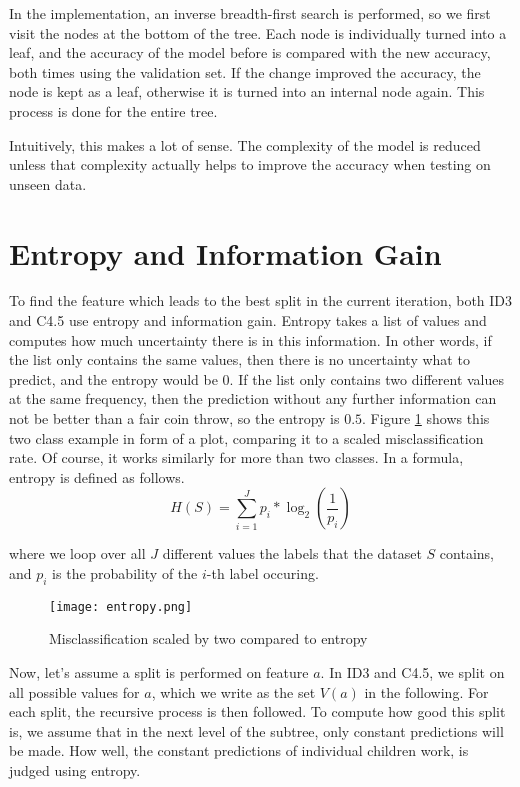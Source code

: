\documentclass[a4paper]{article}
\begin{document}
In the implementation, an inverse breadth-first search is performed, so we first visit the nodes at the bottom of the tree. Each node is individually turned into a leaf, and the accuracy of the model before is compared with the new accuracy, both times using the validation set. If the change improved the accuracy, the node is kept as a leaf, otherwise it is turned into an internal node again. This process is done for the entire tree.

Intuitively, this makes a lot of sense. The complexity of the model is reduced unless that complexity actually helps to improve the accuracy when testing on unseen data.

\section{Entropy and Information Gain}
\label{sec:entropy}

To find the feature which leads to the best split in the current iteration, both ID3 and C4.5 use entropy and information gain. Entropy takes a list of values and computes how much uncertainty there is in this information. In other words, if the list only contains the same values, then there is no uncertainty what to predict, and the entropy would be $0$. If the list only contains two different values at the same frequency, then the prediction without any further information can not be better than a fair coin throw, so the entropy is $0.5$.  Figure \ref{fig:entropy} shows this two class example in form of a plot, comparing it to a scaled misclassification rate. Of course, it works similarly for more than two classes. In a formula, entropy is defined as follows.
\[
	H(S) = \sum\limits_{i = 1}^J p_i * \log_2\left(\frac{1}{p_i}\right)
\]

\noindent where we loop over all $J$ different values the labels that the dataset $S$ contains, and $p_i$ is the probability of the $i$-th label occuring.

\begin{figure}[h]
	\texttt{[image: entropy.png]}
    \caption{Misclassification scaled by two compared to entropy}
    \label{fig:entropy}
\end{figure}

Now, let's assume a split is performed on feature $a$. In ID3 and C4.5, we split on all possible values for $a$, which we write as the set $V(a)$ in the following. For each split, the recursive process is then followed. To compute how good this split is, we assume that in the next level of the subtree, only constant predictions will be made. How well, the constant predictions of individual children work, is judged using entropy.
\end{document}
